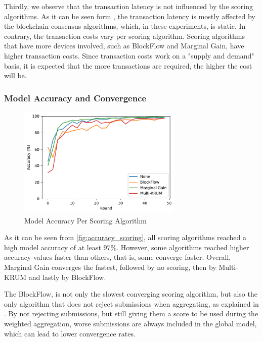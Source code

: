 Thirdly, we observe that the transaction latency is not influenced by the scoring algorithms. As it can be seen form , the transaction latency is mostly affected by the blockchain consensus algorithms, which, in these experiments, is static. In contrary, the transaction costs vary per scoring algorithm. Scoring algorithms that have more devices involved, such as BlockFlow and Marginal Gain, have higher transaction costs. Since transaction costs work on a "supply and demand" basis, it is expected that the more transactions are required, the higher the cost will be.

\subsubsection{Model Accuracy and Convergence}

\begin{figure}[!ht]
    \centering
    \centering
    \includegraphics[width=0.7\textwidth]{graphics/scoring/accuracy.pdf}
    \caption{Model Accuracy Per Scoring Algorithm}
    \label{fig:accuracy_scoring}
\end{figure}

As it can be seen from \autoref{fig:accuracy_scoring}, all scoring algorithms reached a high model accuracy of at least  $97\%$. However, some algorithms reached higher accuracy values faster than others, that is, some converge faster. Overall, Marginal Gain converges the fastest, followed by no scoring, then by Multi-KRUM and lastly by BlockFlow.

The BlockFlow, is not only the slowest converging scoring algorithm, but also the only algorithm that does not reject submissions when aggregating, as explained in . By not rejecting submissions, but still giving them a score to be used during the weighted aggregation, worse submissions are always included in the global model, which can lead to lower convergence rates. 

